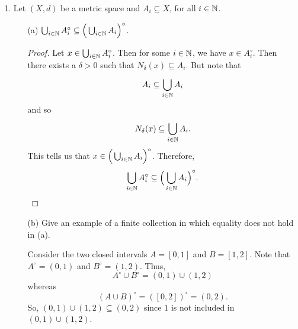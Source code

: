 \documentclass[a4paper]{article}
\begin{document}
\begin{enumerate}
\begin{enumerate}
\begin{solution}
                    \end{solution}
            \end{enumerate}
        \item Let \( (X,d) \) be a metric space and \( {A}_{i} \subseteq X  \), for all \( i \in \mathbb{N}  \).
            \begin{enumerate}
                \item[(a)] \( \bigcup_{ i \in \mathbb{N}  }^{  }  {A}_{i}^{\circ} \subseteq  \Big(  \bigcup_{ i \in \mathbb{N}  }^{  }  {A}_{i} \Big)^{\circ} \).
                    \begin{proof}
                    Let \( x \in \bigcup_{ i \in \mathbb{N}  }^{  }  {A}_{i}^{\circ} \). Then for some \( i \in \mathbb{N}  \), we have \( x \in {A}_{i}^{\circ} \). Then there exists a \( \delta > 0  \) such that \( {N}_{\delta}(x) \subseteq {A}_{i} \). But note that 
                    \[  {A}_{i} \subseteq \bigcup_{ i \in \mathbb{N}  }^{  }  {A}_{i} \]
                    and so
                    \[ {N}_{\delta}(x) \subseteq \bigcup_{ i \in \mathbb{N}  }^{  } {A}_{i}.  \]
                    This tells us that \( x \in \Big(  \bigcup_{ i \in \mathbb{N}  }^{  } {A}_{i} \Big)^{\circ}  \). Therefore, 
                    \[  \bigcup_{ i \in \mathbb{N}  }^{  } {A}_{i}^{\circ} \subseteq \Big(  \bigcup_{ i \in \mathbb{N}  }^{  } {A}_{i} \Big)^{\circ}. \]
                    \end{proof}
                \item[(b)] Give an example of a finite collection in which equality does not hold in (a).
                    \begin{solution}
                        Consider the two closed intervals \( A = [0,1] \) and \( B = [1,2] \). Note that \( A^{\circ} = (0,1) \) and \( B^{\circ} = (1,2) \). Thus,
                        \[  A^{\circ} \cup B^{\circ} = (0,1) \cup (1,2) \]
                        whereas
                        \[  (A \cup B)^{\circ} = ([0,2])^{\circ} = (0,2). \]
                        So, \( (0,1) \cup (1,2) \subseteq (0,2) \) since \( 1 \) is not included in \( (0,1) \cup (1,2) \).
                    \end{solution}
            \end{enumerate}
\end{enumerate}
\end{document}
